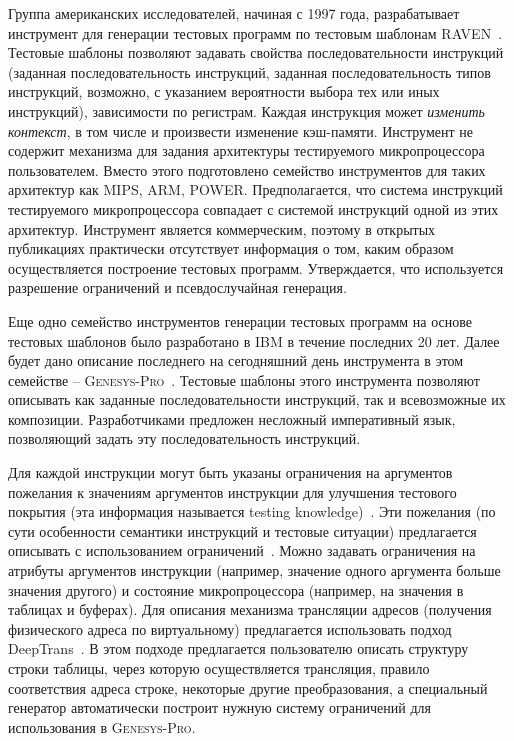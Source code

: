 Группа американских исследователей, начиная с 1997 года,
разрабатывает инструмент для генерации тестовых программ по тестовым
шаблонам \textsc{RAVEN}~\cite{RAVEN}. Тестовые шаблоны позволяют
задавать свойства последовательности инструкций (заданная
последовательность инструкций, заданная последовательность типов
инструкций, возможно, с указанием вероятности выбора тех или иных
инструкций), зависимости по регистрам. Каждая инструкция может
\emph{изменить контекст}, в том числе и произвести изменение
кэш-памяти. Инструмент не содержит механизма для задания архитектуры
тестируемого микропроцессора пользователем. Вместо этого
подготовлено семейство инструментов для таких архитектур как MIPS,
ARM, POWER. Предполагается, что система инструкций тестируемого
микропроцессора совпадает с системой инструкций одной из этих
архитектур. Инструмент является коммерческим, поэтому в открытых
публикациях практически отсутствует информация о том, каким образом
осуществляется построение тестовых программ. Утверждается, что
используется разрешение ограничений и псевдослучайная генерация.

Еще одно семейство инструментов генерации тестовых программ на
основе тестовых шаблонов было разработано в IBM в течение последних
20 лет. Далее будет дано описание последнего на сегодняшний день
инструмента в этом семействе --
\textsc{Genesys-Pro}~\cite{GenesysPro2004}. Тестовые шаблоны этого
инструмента позволяют описывать как заданные последовательности
инструкций, так и всевозможные их композиции. Разработчиками
предложен несложный императивный язык, позволяющий задать эту
последовательность инструкций.

Для каждой инструкции могут быть указаны ограничения на аргументов
пожелания к значениям аргументов инструкции для улучшения тестового
покрытия (эта информация называется testing
knowledge)~\cite{GenesysTK}. Эти пожелания (по сути особенности
семантики инструкций и тестовые ситуации) предлагается описывать с
использованием ограничений~\cite{GenesysPro2004Innovations}. Можно
задавать ограничения на атрибуты аргументов инструкции (например,
значение одного аргумента больше значения другого) и состояние
микропроцессора (например, на значения в таблицах и буферах). Для
описания механизма трансляции адресов (получения физического адреса
по виртуальному) предлагается использовать подход
DeepTrans~\cite{DeepTrans}. В этом подходе предлагается пользователю
описать структуру строки таблицы, через которую осуществляется
трансляция, правило соответствия адреса строке, некоторые другие
преобразования, а специальный генератор автоматически построит
нужную систему ограничений для использования в \textsc{Genesys-Pro}.

